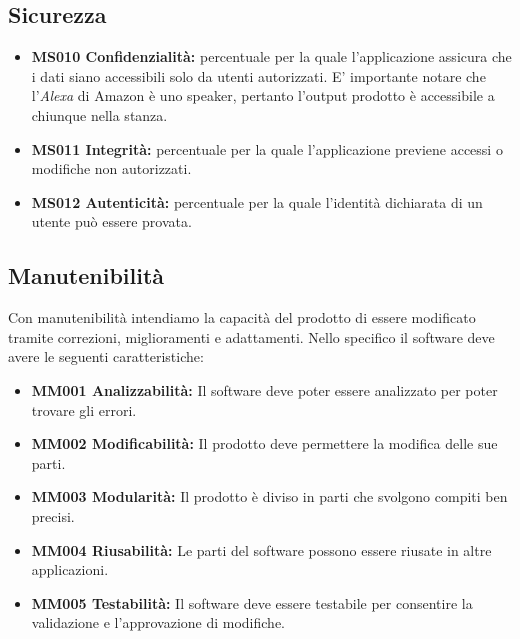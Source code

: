 \subsection{Sicurezza}
\begin{itemize}
	\item \textbf{MS010 Confidenzialità:} percentuale per la quale l'applicazione assicura che i dati siano accessibili solo da utenti autorizzati. E' importante notare che l'\textit{Alexa} di Amazon è uno speaker, pertanto l'output prodotto è accessibile a chiunque nella stanza.
	\item \textbf{MS011 Integrità:} percentuale per la quale l'applicazione previene accessi o modifiche non autorizzati.
	\item \textbf{MS012 Autenticità:} percentuale per la quale l'identità dichiarata di un utente può essere provata.
\end{itemize}
\subsection{Manutenibilità}
Con manutenibilità intendiamo la capacità del prodotto di essere modificato tramite correzioni, miglioramenti e adattamenti.
Nello specifico il software deve avere le seguenti caratteristiche:
\begin{itemize}
	\item \textbf{MM001 Analizzabilità:} Il software deve poter essere analizzato per poter trovare gli errori.
	\item \textbf{MM002 Modificabilità:} Il prodotto deve permettere la modifica delle sue parti.
	\item \textbf{MM003 Modularità:} Il prodotto è diviso in parti che svolgono compiti ben precisi.
	\item \textbf{MM004 Riusabilità:} Le parti del software possono essere riusate in altre applicazioni.
	\item \textbf{MM005 Testabilità:} Il software deve essere testabile per consentire la validazione e l'approvazione di modifiche.
\end{itemize}
